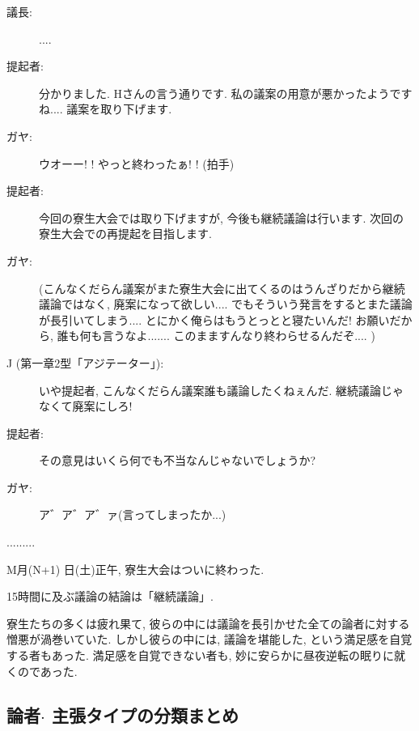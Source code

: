 \documentclass[10pt,b5jsbook,dvips,dvipdfmx,openany]{jsbook}
\theoremstyle{definition}
\begin{document}
\begin{multicols}{2}
\begin{description}
		\item[議長: ]....

		\item[提起者: ]分かりました. Hさんの言う通りです. 私の議案の用意が悪かったようですね.... 議案を取り下げます.

		\item[ガヤ: ]ウオーー! ! やっと終わったぁ! ! (拍手)

		\item[提起者: ]今回の寮生大会では取り下げますが, 今後も継続議論は行います. 次回の寮生大会での再提起を目指します.

		\item[ガヤ: ](こんなくだらん議案がまた寮生大会に出てくるのはうんざりだから継続議論ではなく, 廃案になって欲しい.... でもそういう発言をするとまた議論が長引いてしまう.... とにかく俺らはもうとっとと寝たいんだ! お願いだから, 誰も何も言うなよ....... このまますんなり終わらせるんだぞ.... )

		\item[J (第一章2型「アジテーター」): ]いや提起者, こんなくだらん議案誰も議論したくねぇんだ. 継続議論じゃなくて廃案にしろ!

		\item[提起者: ]その意見はいくら何でも不当なんじゃないでしょうか?

		\item[ガヤ: ]ア゛ア゛ア゛ァ(言ってしまったか...)

		\end{description}
		.........

		M月(N+1) 日(土)正午, 寮生大会はついに終わった.

		15時間に及ぶ議論の結論は「継続議論」.

		寮生たちの多くは疲れ果て, 彼らの中には議論を長引かせた全ての論者に対する憎悪が渦巻いていた. しかし彼らの中には, 議論を堪能した, という満足感を自覚する者もあった. 満足感を自覚できない者も, 妙に安らかに昼夜逆転の眠りに就くのであった.

		\end{multicols}
		\normalsize

		\subsection{論者$ \cdot $ 主張タイプの分類まとめ}
\end{document}
